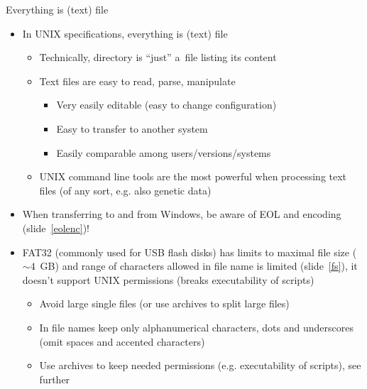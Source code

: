 \documentclass[compress, ucs, xelatex, 11pt, xcolor=svgnames, aspectratio=169,
	hyperref={
		bookmarks=true,
		unicode=true,
		colorlinks=true,
		pdftitle={Linux, command line and MetaCentrum},
		plainpages=false,
		pdfauthor={Vojtech Zeisek},
		pdfsubject={Course about use of Linux command line, writing shell scripts and using MetaCentrum of CESNET},
		pdfcreator={XeLaTeX},
		pdfkeywords={Linux, GNU, BASH, shell, command line, MetaCentrum},
		linkcolor=DarkRed, %
		anchorcolor=DarkBlue, %
		citecolor=Indigo, %
		filecolor=NavyBlue, %
		menucolor=DarkMagenta, %
		urlcolor=DarkBlue, %
		pdftex},
	url={hyphens, lowtilde} %
	]{beamer}
\begin{document}
\begin{frame}{Everything is (text) file}
	\begin{itemize}
		\item In UNIX specifications, everything is (text) file
		\begin{itemize}
			\item Technically, directory is \enquote{just} a~file listing its content
			\item Text files are easy to read, parse, manipulate
			\begin{itemize}
				\item Very easily editable (easy to change configuration)
				\item Easy to transfer to another system
				\item Easily comparable among users/versions/systems
			\end{itemize}
			\item UNIX command line tools are the most powerful when processing text files (of any sort, e.g. also genetic data)
		\end{itemize}
		\item When transferring to and from Windows, be aware of EOL and encoding (slide~\ref{eolenc})!
		\item FAT32 (commonly used for USB flash disks) has limits to maximal file size ($\sim4$~GB) and range of characters allowed in file name is limited (slide~\ref{fs}), it doesn't support UNIX permissions (breaks executability of scripts)
		\begin{itemize}
			\item Avoid large single files (or use archives to split large files)
			\item In file names keep only alphanumerical characters, dots and underscores (omit spaces and accented characters)
			\item Use archives to keep needed permissions (e.g. executability of scripts), see further
		\end{itemize}
		\end{itemize}
\end{frame}
\end{document}
